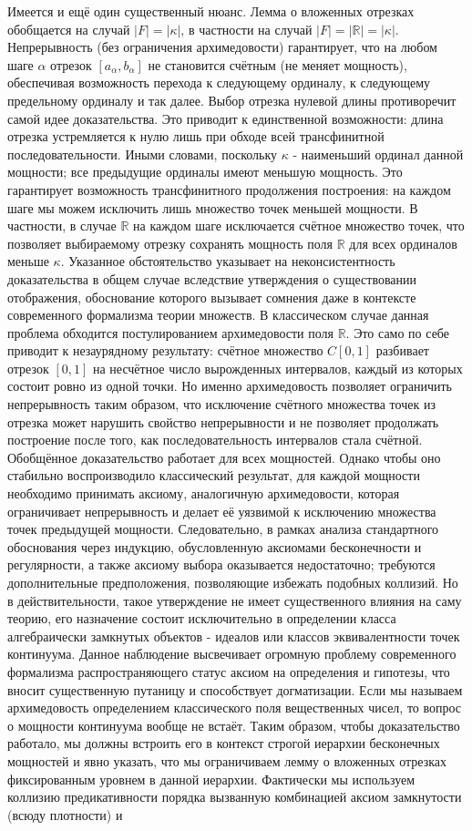 \documentclass[12pt]{article}
\begin{document}
Имеется и ещё один существенный нюанс. Лемма о вложенных отрезках обобщается на случай $|F| = |\kappa|$, в частности на случай $|F| = |\mathbb{R}| = |\kappa|$. Непрерывность (без ограничения архимедовости) гарантирует, что на любом шаге $\alpha$ отрезок $[a_{\alpha}, b_{\alpha}]$ не становится счётным (не меняет мощность), обеспечивая возможность перехода к следующему ординалу, к следующему предельному ординалу и так далее. Выбор отрезка нулевой длины противоречит самой идее доказательства. Это приводит к единственной возможности: длина отрезка устремляется к нулю лишь при обходе всей трансфинитной последовательности. Иными словами, поскольку $\kappa$ - наименьший ординал данной мощности; все предыдущие ординалы имеют меньшую мощность. Это гарантирует возможность трансфинитного продолжения построения: на каждом шаге мы можем исключить лишь множество точек меньшей мощности. В частности, в случае $\mathbb{R}$ на каждом шаге исключается счётное множество точек, что позволяет выбираемому отрезку сохранять мощность поля $\mathbb{R}$ для всех ординалов меньше $\kappa$. Указанное обстоятельство указывает на неконсистентность доказательства в общем случае вследствие утверждения о существовании отображения, обоснование которого вызывает сомнения даже в контексте современного формализма теории множеств. В классическом случае данная проблема обходится постулированием архимедовости поля $\mathbb{R}$. Это само по себе приводит к незаурядному результату: счётное множество $C[0, 1]$ разбивает отрезок $[0, 1]$ на несчётное число вырожденных интервалов, каждый из которых состоит ровно из одной точки. Но именно архимедовость позволяет ограничить непрерывность таким образом, что исключение счётного множества точек из отрезка может нарушить свойство непрерывности и не позволяет продолжать построение после того, как последовательность интервалов стала счётной. Обобщённое доказательство работает для всех мощностей. Однако чтобы оно стабильно воспроизводило классический результат, для каждой мощности необходимо принимать аксиому, аналогичную архимедовости, которая ограничивает непрерывность и делает её уязвимой к исключению множества точек предыдущей мощности. Следовательно, в рамках анализа стандартного обоснования через индукцию, обусловленную аксиомами бесконечности и регулярности, а также аксиому выбора оказывается недостаточно; требуются дополнительные предположения, позволяющие избежать подобных коллизий. Но в действительности, такое утверждение не имеет существенного влияния на саму теорию, его назначение состоит исключительно в определении класса алгебраически замкнутых объектов - идеалов или классов эквивалентности точек континуума. Данное наблюдение высвечивает огромную проблему современного формализма распространяющего статус аксиом на определения и гипотезы, что вносит существенную путаницу и способствует догматизации. Если мы называем архимедовость определением классического поля вещественных чисел, то вопрос о мощности континуума вообще не встаёт. Таким образом, чтобы доказательство работало, мы должны встроить его в контекст строгой иерархии бесконечных мощностей и явно указать, что мы ограничиваем лемму о вложенных отрезках фиксированным уровнем в данной иерархии. Фактически мы используем коллизию предикативности порядка вызванную комбинацией аксиом замкнутости (всюду плотности) и 
\end{document}
